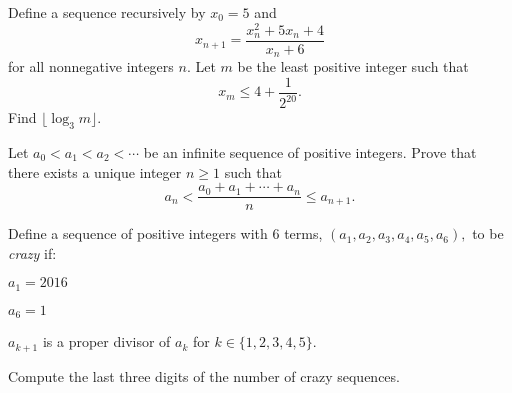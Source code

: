 \documentclass[mast]{lucky}
\begin{document}
\begin{prob}[AMC 12B 2019/22]{9}
Define a sequence recursively by $x_0=5$ and \[x_{n+1}=\frac{x_n^2+5x_n+4}{x_n+6}\] for all nonnegative integers $n.$ Let $m$ be the least positive integer such that \[x_m\leq 4+\frac{1}{2^{20}}.\] Find $\lfloor \log_3m\rfloor.$
\end{prob}


\begin{prob}[IMO 2014/1]{13}
Let $a_0<a_1<a_2<\cdots$ be an infinite sequence of positive integers. Prove that there exists a unique integer $n\ge1$ such that
\[a_n<\frac{a_0+a_1+\cdots + a_n}{n}\le a_{n+1}.\]
\end{prob}

\begin{prob}[rd123 AIME 2020/12]{13}
Define a sequence of positive integers with $6$ terms, $(a_1,a_2,a_3,a_4,a_5,a_6),$ to be \textit{crazy} if:
	\begin{itemize}
		\Item $a_1=2016$
        
		\Item $a_6=1$
        
		\Item $a_{k+1}$ is a proper divisor of $a_k$ for $k\in \{1,2,3,4,5\}.$
	\end{itemize}
Compute the last three digits of the number of crazy sequences.
\end{prob}
\end{document}
